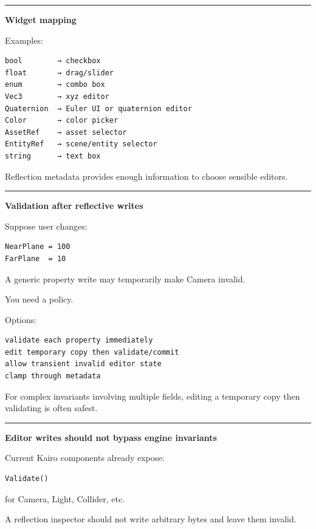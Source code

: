 \begin{center}\rule{0.5\linewidth}{0.5pt}\end{center}

\textbf{Widget mapping}

Examples:

\begin{verbatim}
bool        → checkbox
float       → drag/slider
enum        → combo box
Vec3        → xyz editor
Quaternion  → Euler UI or quaternion editor
Color       → color picker
AssetRef    → asset selector
EntityRef   → scene/entity selector
string      → text box
\end{verbatim}

Reflection metadata provides enough information to choose sensible editors.

\begin{center}\rule{0.5\linewidth}{0.5pt}\end{center}

\textbf{Validation after reflective writes}

Suppose user changes:

\begin{verbatim}
NearPlane = 100
FarPlane  = 10
\end{verbatim}

A generic property write may temporarily make Camera invalid.

You need a policy.

Options:

\begin{verbatim}
validate each property immediately
edit temporary copy then validate/commit
allow transient invalid editor state
clamp through metadata
\end{verbatim}

For complex invariants involving multiple fields, editing a temporary copy then validating is often safest.

\begin{center}\rule{0.5\linewidth}{0.5pt}\end{center}

\textbf{Editor writes should not bypass engine invariants}

Current Kairo components already expose:

\begin{verbatim}
Validate()
\end{verbatim}

for Camera, Light, Collider, etc.

A reflection inspector should not write arbitrary bytes and leave them invalid.

